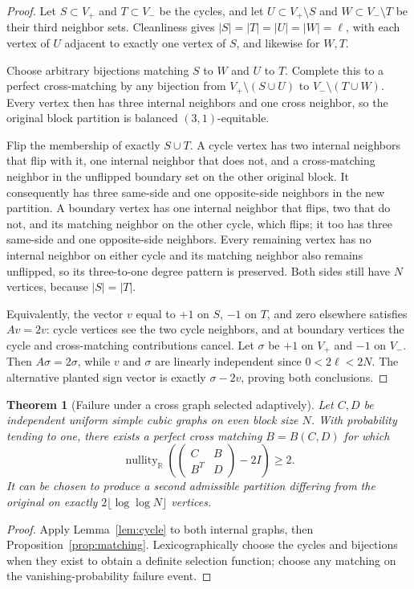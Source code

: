 \documentclass[11pt]{article}
\newtheorem{theorem}{Theorem}
\begin{document}
\begin{proof}
Let $S\subset V_+$ and $T\subset V_-$ be the cycles, and let
$U\subset V_+\setminus S$ and $W\subset V_-\setminus T$ be their third
neighbor sets. Cleanliness gives $|S|=|T|=|U|=|W|=\ell$, with each
vertex of $U$ adjacent to exactly one vertex of $S$, and likewise for
$W,T$.

Choose arbitrary bijections matching $S$ to $W$ and $U$ to $T$.
Complete this to a perfect cross-matching by any bijection from
$V_+\setminus(S\cup U)$ to $V_-\setminus(T\cup W)$.
Every vertex then has three internal neighbors and one cross neighbor,
so the original block partition is balanced $(3,1)$-equitable.

Flip the membership of exactly $S\cup T$. A cycle vertex has two
internal neighbors that flip with it, one internal neighbor that does
not, and a cross-matching neighbor in the unflipped boundary set on the
other original block. It consequently has three same-side and one
opposite-side neighbors in the new partition. A boundary vertex has
one internal neighbor that flips, two that do not, and its matching
neighbor on the other cycle, which flips; it too has three same-side
and one opposite-side neighbors. Every remaining vertex has no internal
neighbor on either cycle and its matching neighbor also remains
unflipped, so its three-to-one degree pattern is preserved. Both sides
still have $N$ vertices, because $|S|=|T|$.

Equivalently, the vector $v$ equal to $+1$ on $S$, $-1$ on $T$, and
zero elsewhere satisfies $Av=2v$: cycle vertices see the two cycle
neighbors, and at boundary vertices the cycle and cross-matching
contributions cancel. Let $\sigma$ be $+1$ on $V_+$ and $-1$ on
$V_-$. Then $A\sigma=2\sigma$, while $v$ and $\sigma$ are linearly
independent since $0<2\ell<2N$. The alternative planted sign vector is
exactly $\sigma-2v$, proving both conclusions.
\end{proof}

\begin{theorem}[Failure under a cross graph selected adaptively]
Let $C,D$ be independent uniform simple cubic graphs on even block size
$N$. With probability tending to one, there exists a perfect cross
matching $B=B(C,D)$ for which
\[
 \operatorname{nullity}_{\mathbb R}
 \left(\begin{pmatrix}C&B\\B^T&D\end{pmatrix}-2I\right)\ge2.
\]
It can be chosen to produce a second admissible partition differing
from the original on exactly $2\lfloor\log\log N\rfloor$ vertices.
\end{theorem}
\begin{proof}
Apply Lemma~\ref{lem:cycle} to both internal graphs, then
Proposition~\ref{prop:matching}. Lexicographically choose the cycles
and bijections when they exist to obtain a definite selection function;
choose any matching on the vanishing-probability failure event.
\end{proof}
\end{document}
